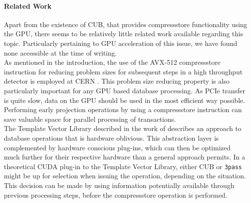 \documentclass{tudscrreprt}
\begin{document}
		\paragraph{Related Work} Apart from the existence of CUB, that provides compressstore functionality using the GPU, there seems to be relatively little related work available regarding this topic. Particularly pertaining to GPU acceleration of this issue, we have found none accessible at the time of writing. \\
		As mentioned in the introduction, the use of the AVX-512 compressstore instruction for reducing problem sizes for subsequent steps in a high throughput detector is employed at CERN \cite{cern_datastreaming}. This problem size reducing property is also particularly important for any GPU based database processing. As PCIe transfer is quite slow, data on the GPU should be used in the most efficient way possible. Performing early projection operations by using a compressstore instruction can save valuable space for parallel processing of transactions. \\
		The Template Vector Library described in the work of \citeauthor{tvl} \cite{tvl} describes an approach to database operations that is hardware oblivious. This abstraction layer is complemented by hardware conscious plug-ins, which can then be optimized much further for their respective hardware than a general approach permits. In a theoretical CUDA plug-in to the Template Vector Library, either CUB or \texttt{3pass} might be up for selection when issuing the operation, depending on the situation. This decision can be made by using information potentially available through previous processing steps, before the compressstore operation is performed. \\
\end{document}
